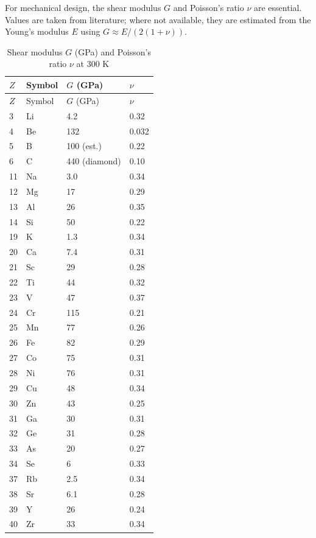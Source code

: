 \documentclass[12pt,a4paper]{article}
\begin{document}
	For mechanical design, the shear modulus \(G\) and Poisson's ratio \(\nu\) are essential. Values are taken from literature; where not available, they are estimated from the Young's modulus \(E\) using \(G \approx E/(2(1+\nu))\).
	
	\begin{longtable}{p{0.6cm}p{1.2cm}p{1.5cm}p{1.5cm}}
		\caption{Shear modulus \(G\) (GPa) and Poisson's ratio \(\nu\) at 300 K} \label{tab:elastic-constants-all} \\
		\toprule
		\(Z\) & Symbol & \(G\) (GPa) & \(\nu\) \\
		\midrule
		\endfirsthead
		\toprule
		\(Z\) & Symbol & \(G\) (GPa) & \(\nu\) \\
		\midrule
		\endhead
		3  & Li & 4.2 & 0.32 \\
		4  & Be & 132 & 0.032 \\
		5  & B  & 100 (est.) & 0.22 \\
		6  & C  & 440 (diamond) & 0.10 \\
		11 & Na & 3.0 & 0.34 \\
		12 & Mg & 17 & 0.29 \\
		13 & Al & 26 & 0.35 \\
		14 & Si & 50 & 0.22 \\
		19 & K  & 1.3 & 0.34 \\
		20 & Ca & 7.4 & 0.31 \\
		21 & Sc & 29 & 0.28 \\
		22 & Ti & 44 & 0.32 \\
		23 & V  & 47 & 0.37 \\
		24 & Cr & 115 & 0.21 \\
		25 & Mn & 77 & 0.26 \\
		26 & Fe & 82 & 0.29 \\
		27 & Co & 75 & 0.31 \\
		28 & Ni & 76 & 0.31 \\
		29 & Cu & 48 & 0.34 \\
		30 & Zn & 43 & 0.25 \\
		31 & Ga & 30 & 0.31 \\
		32 & Ge & 31 & 0.28 \\
		33 & As & 20 & 0.27 \\
		34 & Se & 6 & 0.33 \\
		37 & Rb & 2.5 & 0.34 \\
		38 & Sr & 6.1 & 0.28 \\
		39 & Y  & 26 & 0.24 \\
		40 & Zr & 33 & 0.34 \\

\end{longtable}
\end{document}
